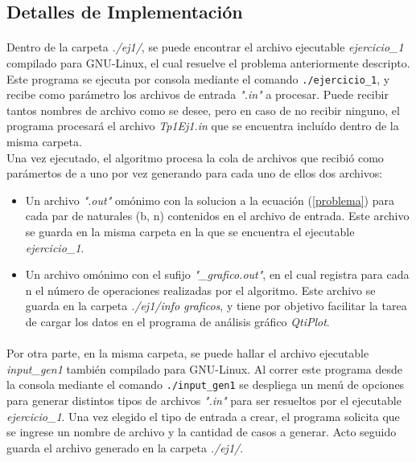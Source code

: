 \subsection{Detalles de Implementación}

\paragraph{}
Dentro de la carpeta \textit{./ej1/}, se puede encontrar el archivo ejecutable \textit{ejercicio\_1} compilado para GNU-Linux, el cual resuelve el problema anteriormente descripto. Este programa se ejecuta por consola mediante el comando \texttt{./ejercicio\_1}, y recibe como parámetro los archivos de entrada \textit{".in"} a procesar. Puede recibir tantos nombres de archivo como se desee, pero en caso de no recibir ninguno, el programa procesará el archivo \textit{Tp1Ej1.in} que se encuentra incluído dentro de la misma carpeta. \\
Una vez ejecutado, el algoritmo procesa la cola de archivos que recibió como parámertos de a uno por vez generando para cada uno de ellos dos archivos:
	\begin{itemize}
		\item{Un archivo \textit{".out"} omónimo con la solucion a la ecuación (\ref{problema}) para cada par de naturales (b, n) contenidos en el archivo de entrada. Este archivo se guarda en la misma carpeta en la que se encuentra el ejecutable \textit{ejercicio\_1}}.
		\item{Un archivo omónimo con el sufijo \textit{"\_grafico.out"}, en el cual registra para cada n el número de operaciones realizadas por el algoritmo. Este archivo se guarda en la carpeta \textit{./ej1/info graficos}, y tiene por objetivo facilitar la tarea de cargar los datos en el programa de análisis gráfico \textit{QtiPlot}}.
	\end{itemize}

\paragraph{}		
Por otra parte, en la misma carpeta, se puede hallar el archivo ejecutable \textit{input\_gen1} también compilado para GNU-Linux. Al correr este programa desde la consola mediante el comando \texttt{./input\_gen1} se despliega un menú de opciones para generar distintos tipos de archivos \textit{".in"} para ser resueltos por el ejecutable \textit{ejercicio\_1}. Una vez elegido el tipo de entrada a crear, el programa solicita que se ingrese un nombre de archivo y la cantidad de casos a generar. Acto seguido guarda el archivo generado en la carpeta \textit{./ej1/}.

